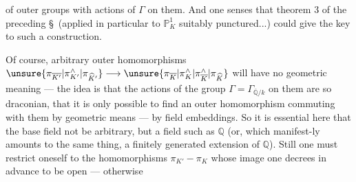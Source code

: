of outer  groups with actions of $\Gamma$ on them. And one senses that theorem 3 of the preceding \S\ (applied in particular to $\mathbb P_K^1$ suitably punctured...) could give the key to such a construction.

Of  course, arbitrary outer homomorphisms $\unsure{\pi_{\overline{K'}}|\pi^{\wedge}_{K'}|\pi_{\widehat K'}}\longrightarrow\unsure{\pi_{\overline K}|\pi^{\wedge}_K|\pi^{\wedge}_{\overline K}|\pi_{\widehat K}}$ will have no geometric meaning --- the idea is that the actions of the group $\Gamma=\Gamma_{\overline{\mathbb Q}/k}$ on them are so draconian, that it is only possible to find an outer homomorphism commuting with them by geometric means --- by field embeddings. So it is essential here that the base field not be arbitrary, but a field such as $\mathbb Q$ (or, which manifest-ly amounts to the same thing, a finitely generated extension of $\mathbb Q$). Still one must restrict oneself to the homomorphisms $\pi_{K'}-\pi_K$ whose image one decrees in advance to be open --- otherwise
